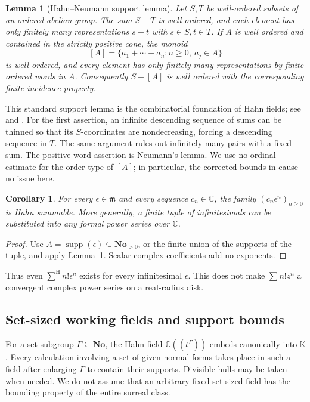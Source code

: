 \documentclass[11pt,oneside]{article}
\newtheorem{lemma}[theorem]{Lemma}
\newtheorem{corollary}[theorem]{Corollary}
\theoremstyle{definition}\newtheorem{definition}[theorem]{Definition}
\newcommand{\No}{\mathbf{No}}
\newcommand{\K}{\mathbb K}
\newcommand{\C}{\mathbb C}
\newcommand{\mm}{\mathfrak m}
\newcommand{\supp}{\operatorname{supp}}
\newcommand{\Hsum}{\mathop{\sum}\nolimits^{\mathrm H}}
\begin{document}
\begin{lemma}[Hahn--Neumann support lemma]\label{lem:neumann}
Let $S,T$ be well-ordered subsets of an ordered abelian group.
The sum $S+T$ is well ordered, and each element has only finitely many representations $s+t$ with $s\in S,t\in T$.
If $A$ is well ordered and contained in the strictly positive cone, the monoid
\[
 [A]=\{a_1+\cdots+a_n:n\geq0,\ a_j\in A\}
\]
is well ordered, and every element has only finitely many representations by finite ordered words in $A$. Consequently $S+[A]$ is well ordered with the corresponding finite-incidence property.
\end{lemma}
This standard support lemma is the combinatorial foundation of Hahn fields; see \cite[Section 7.21]{Alling} and \cite[Lemma 2.36]{Marker}. For the first assertion, an infinite descending sequence of sums can be thinned so that its $S$-coordinates are nondecreasing, forcing a descending sequence in $T$. The same argument rules out infinitely many pairs with a fixed sum. The positive-word assertion is Neumann's lemma. We use no ordinal estimate for the order type of $[A]$; in particular, the corrected bounds in \cite{vdDEerr} cause no issue here.

\begin{corollary}\label{cor:formal-eps}
For every $\epsilon\in\mm$ and every sequence $c_n\in\C$, the family $(c_n\epsilon^n)_{n\geq0}$ is Hahn summable. More generally, a finite tuple of infinitesimals can be substituted into any formal power series over $\C$.
\end{corollary}
\begin{proof}
Use $A=\supp(\epsilon)\subseteq\No_{>0}$, or the finite union of the supports of the tuple, and apply Lemma~\ref{lem:neumann}. Scalar complex coefficients add no exponents.
\end{proof}
Thus even $\Hsum n!\epsilon^n$ exists for every infinitesimal $\epsilon$. This does not make $\sum n!z^n$ a convergent complex power series on a real-radius disk.

\subsection{Set-sized working fields and support bounds}
For a set subgroup $\Gamma\subseteq\No$, the Hahn field $\C((t^\Gamma))$ embeds canonically into $\K$. Every calculation involving a set of given normal forms takes place in such a field after enlarging $\Gamma$ to contain their supports. Divisible hulls may be taken when needed. We do not assume that an arbitrary fixed set-sized field has the bounding property of the entire surreal class.
\end{document}
